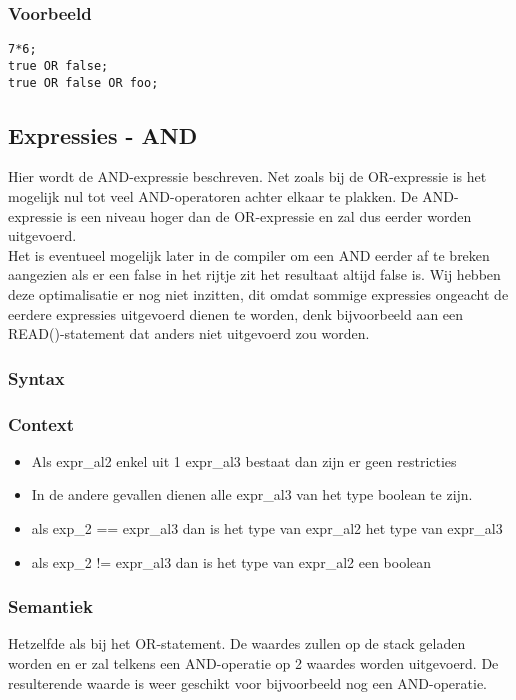 \documentclass[]{article}
\begin{document}
\subsubsection{Voorbeeld}
\begin{lstlisting}[style=SELMA]
7*6;
true OR false;
true OR false OR foo;
\end{lstlisting}

\subsection{Expressies - AND}
Hier wordt de AND-expressie beschreven. Net zoals bij de OR-expressie is het mogelijk nul tot veel AND-operatoren achter elkaar te plakken. De AND-expressie is een niveau hoger dan de OR-expressie en zal dus eerder worden uitgevoerd. \\
Het is eventueel mogelijk later in de compiler om een AND eerder af te breken aangezien als er een false in het rijtje zit het resultaat altijd false is. Wij hebben deze optimalisatie er nog niet inzitten, dit omdat sommige expressies ongeacht de eerdere expressies uitgevoerd dienen te worden, denk bijvoorbeeld aan een READ()-statement dat anders niet uitgevoerd zou worden.
\subsubsection{Syntax}

\subsubsection{Context}
\begin{itemize}
\item Als expr\_al2 enkel uit 1 expr\_al3 bestaat dan zijn er geen restricties
\item In de andere gevallen dienen alle expr\_al3 van het type boolean te zijn.
\item als exp\_2 == expr\_al3 dan is het type van expr\_al2 het type van expr\_al3
\item als exp\_2 != expr\_al3 dan is het type van expr\_al2 een boolean
\end{itemize}
\subsubsection{Semantiek}
Hetzelfde als bij het OR-statement. De waardes zullen op de stack geladen worden en er zal telkens een AND-operatie op 2 waardes worden uitgevoerd. De resulterende waarde is weer geschikt voor bijvoorbeeld nog een AND-operatie.
\end{document}
